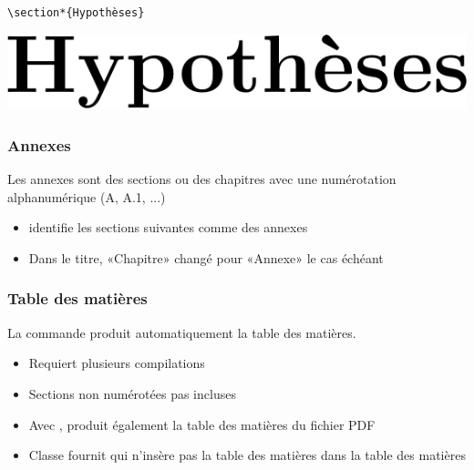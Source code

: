\begin{frame}[fragile=singleslide]
\begin{itemize}
\begin{demo}
\begin{minipage}{0.45\linewidth}
\begin{lstlisting}
\section*{Hypothèses}
\end{lstlisting}
      \end{minipage}
      \hfill
      \begin{minipage}{0.45\linewidth}
        \includegraphics[height=0.8\baselineskip,keepaspectratio]{section-non-num}
      \end{minipage}
    \end{demo}
  \end{itemize}
\end{frame}

\begin{frame}[fragile=singleslide]
  \frametitle{Annexes}

  Les annexes sont des sections ou des chapitres avec une numérotation
  alphanumérique (A, A.1, ...)
  \begin{itemize}
  \item {} identifie les sections suivantes comme des annexes
  \item Dans le titre, «Chapitre» changé pour «Annexe» le cas échéant
  \end{itemize}
\end{frame}

\begin{frame}[fragile=singleslide]
  \frametitle{Table des matières}

  La commande  produit automatiquement la table
  des matières.

  \begin{itemize}
  \item Requiert plusieurs compilations
  \item Sections non numérotées pas incluses
  \item Avec , produit également la table des
    matières du fichier PDF
  \item Classe  fournit  qui
    n'insère pas la table des matières dans la table des matières
  \end{itemize}
\end{frame}

